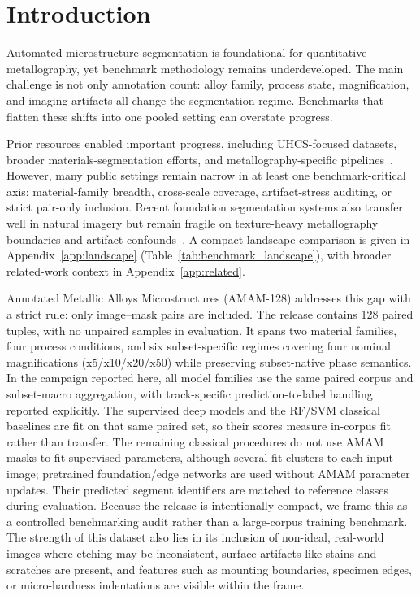 \documentclass{article}
\newcommand{\datasetname}{AMAM-128}
\newcommand{\datasetfull}{Annotated Metallic Alloys Microstructures}
\newcommand{\paircount}{128}
\begin{document}
\section{Introduction}
Automated microstructure segmentation is foundational for quantitative metallography, yet benchmark methodology remains underdeveloped. The main challenge is not only annotation count: alloy family, process state, magnification, and imaging artifacts all change the segmentation regime. Benchmarks that flatten these shifts into one pooled setting can overstate progress.

Prior resources enabled important progress, including UHCS-focused datasets, broader materials-segmentation efforts, and metallography-specific pipelines~\citep{decost2017uhcsdb,decost2019high,luengo2022tutorial,rusanovsky2020mlography,rusanovsky2022end}. However, many public settings remain narrow in at least one benchmark-critical axis: material-family breadth, cross-scale coverage, artifact-stress auditing, or strict pair-only inclusion. Recent foundation segmentation systems also transfer well in natural imagery but remain fragile on texture-heavy metallography boundaries and artifact confounds~\citep{kirillov2023segment,ji2023segment,rusanovsky2025texturesam,cohen2024mlographypp}. A compact landscape comparison is given in Appendix~\ref{app:landscape} (Table~\ref{tab:benchmark_landscape}), with broader related-work context in Appendix~\ref{app:related}.

\datasetfull{} (\datasetname{}) addresses this gap with a strict rule: only
image--mask pairs are included. The release contains \paircount{} paired
tuples, with no unpaired samples in evaluation. It spans two material families,
four process conditions, and six subset-specific regimes covering four nominal
magnifications (x5/x10/x20/x50) while preserving subset-native phase semantics.
In the campaign reported here, all model families use the same paired corpus
and subset-macro aggregation, with track-specific prediction-to-label handling
reported explicitly. The supervised deep models
and the RF/SVM classical baselines are fit on that same paired set, so their
scores measure in-corpus fit rather than transfer. The remaining classical
procedures do not use AMAM masks to fit supervised parameters, although
several fit clusters to each input image; pretrained foundation/edge networks
are used without AMAM parameter updates. Their predicted segment identifiers
are matched to reference classes during evaluation. Because the release is intentionally compact, we frame this
as a controlled benchmarking audit rather than a large-corpus training
benchmark. The strength of this dataset also lies in its inclusion of
non-ideal, real-world images where etching may be inconsistent, surface
artifacts like stains and scratches are present, and features such as mounting
boundaries, specimen edges, or micro-hardness indentations are visible within
the frame.
\end{document}
